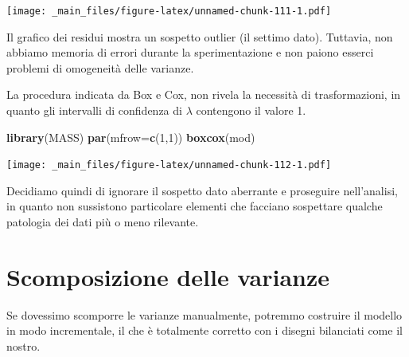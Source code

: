 \documentclass[a4paper,12pt,oneside]{book}
\newenvironment{Shaded}{\begin{snugshade}}{\end{snugshade}}
\newcommand{\KeywordTok}[1]{\textcolor[rgb]{0.13,0.29,0.53}{\textbf{#1}}}
\newcommand{\DataTypeTok}[1]{\textcolor[rgb]{0.13,0.29,0.53}{#1}}
\newcommand{\DecValTok}[1]{\textcolor[rgb]{0.00,0.00,0.81}{#1}}
\newcommand{\NormalTok}[1]{#1}
\theoremstyle{definition}
\theoremstyle{definition}
\theoremstyle{definition}
\theoremstyle{remark}
\begin{document}
\texttt{[image: \_main\_files/figure-latex/unnamed-chunk-111-1.pdf]}

Il grafico dei residui mostra un sospetto outlier (il settimo dato).
Tuttavia, non abbiamo memoria di errori durante la sperimentazione e non
paiono esserci problemi di omogeneità delle varianze.

La procedura indicata da Box e Cox, non rivela la necessità di
trasformazioni, in quanto gli intervalli di confidenza di \(\lambda\)
contengono il valore 1.

\begin{Shaded}
\begin{Highlighting}[]
\KeywordTok{library}\NormalTok{(MASS)}
\KeywordTok{par}\NormalTok{(}\DataTypeTok{mfrow=}\KeywordTok{c}\NormalTok{(}\DecValTok{1}\NormalTok{,}\DecValTok{1}\NormalTok{))}
\KeywordTok{boxcox}\NormalTok{(mod)}
\end{Highlighting}
\end{Shaded}

\texttt{[image: \_main\_files/figure-latex/unnamed-chunk-112-1.pdf]}

Decidiamo quindi di ignorare il sospetto dato aberrante e proseguire
nell'analisi, in quanto non sussistono particolare elementi che facciano
sospettare qualche patologia dei dati più o meno rilevante.

\section{Scomposizione delle
varianze}\label{scomposizione-delle-varianze}

Se dovessimo scomporre le varianze manualmente, potremmo costruire il
modello in modo incrementale, il che è totalmente corretto con i disegni
bilanciati come il nostro.
\end{document}
